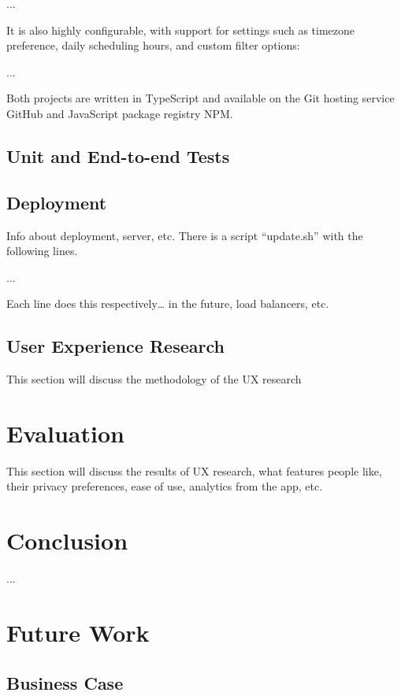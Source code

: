 \documentclass{article}
\begin{document}
...

It is also highly configurable, with support for settings such as timezone preference, daily scheduling hours, and custom filter options:

...

Both projects are written in TypeScript and available on the Git hosting service GitHub and JavaScript package registry NPM.

\subsection{Unit and End-to-end Tests}

\subsection{Deployment}

Info about deployment, server, etc. There is a script “update.sh” with the following lines.

...


Each line does this respectively… in the future, load balancers, etc.

\subsection{User Experience Research}

This section will discuss the methodology of the UX research

\newpage

\section{Evaluation}

This section will discuss the results of UX research, what features people like, their privacy preferences, ease of use, analytics from the app, etc.

\newpage

\section{Conclusion}

...

\newpage

\section{Future Work}

\subsection{Business Case}
\end{document}
